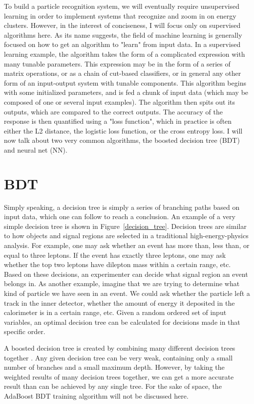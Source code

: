 To build a particle recognition system, we will eventually require unsupervised learning in order to implement systems that recognize and zoom in on energy clusters. However, in the interest of conciseness, I will focus only on supervised algorithms here. As its name suggests, the field of machine learning is generally focused on how to get an algorithm to "learn" from input data. In a supervised learning example, the algorithm takes the form of a complicated expression with many tunable parameters. This expression may be in the form of a series of matrix operations, or as a chain of cut-based classifiers, or in general any other form of an input-output system with tunable components. This algorithm begins with some initialized parameters, and is fed a chunk of input data (which may be composed of one or several input examples). The algorithm then spits out its outputs, which are compared to the correct outputs. The accuracy of the response is then quantified using a "loss function", which in practice is often either the L2 distance, the logistic loss function, or the cross entropy loss. I will now talk about two very common algorithms, the boosted decision tree (BDT) and neural net (NN).

\section{BDT}

Simply speaking, a decision tree is simply a series of branching paths based on input data, which one can follow to reach a conclusion. An example of a very simple decision tree is shown in Figure~\ref{decision_tree}. Decision trees are similar to how objects and signal regions are selected in a traditional high-energy-physics analysis. For example, one may ask whether an event has more than, less than, or equal to three leptons. If the event has exactly three leptons, one may ask whether the top two leptons have dilepton mass within a certain range, etc. Based on these decisions, an experimenter can decide what signal region an event belongs in. As another example, imagine that we are trying to determine what kind of particle we have seen in an event. We could ask whether the particle left a track in the inner detector, whether the amount of energy it deposited in the calorimeter is in a certain range, etc. Given a random ordered set of input variables, an optimal decision tree can be calculated for decisions made in that specific order.

A boosted decision tree is created by combining many different decision trees together \cite{BDT}. Any given decision tree can be very weak, containing only a small number of branches and a small maximum depth. However, by taking the weighted results of many decision trees together, we can get a more accurate result than can be achieved by any single tree. For the sake of space, the AdaBoost BDT training algorithm will not be discussed here.

